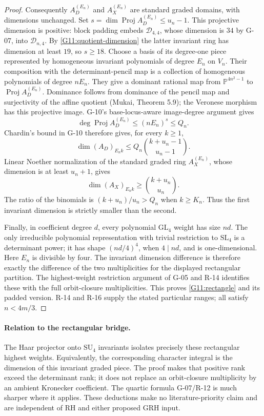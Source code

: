 \documentclass[11pt,a4paper]{article}
\theoremstyle{definition}\newtheorem{definition}{Definition}
\begin{document}
\begin{proof}
Consequently $A_D^{(E_n)}$ and $A_X^{(E_n)}$ are standard
graded domains, with dimensions unchanged. Set
$s=\dim\operatorname{Proj}A_D^{(E_n)}\leq u_n-1$.
This projective dimension is positive: block padding embeds
$\mathcal D_{4,4}$, whose dimension is $34$ by G-07,
into $\mathcal D_{n,4}$. By \eqref{G11:quotient-dimension}
the latter invariant ring has dimension at least $19$,
so $s\geq18$.
Choose a basis of its degree-one piece represented by
homogeneous invariant polynomials of degree $E_n$ on $V_n$.
Their composition with the determinant-pencil map is a
collection of homogeneous polynomials of degree $nE_n$.
They give a dominant rational map from
$\mathbb P^{4n^2-1}$ to $\operatorname{Proj}A_D^{(E_n)}$.
Dominance follows from dominance of the pencil map and
surjectivity of the affine quotient (Mukai, Theorem 5.9);
the Veronese morphism has this projective image. G-10's
base-locus-aware image-degree argument gives
\[
 \deg\operatorname{Proj}A_D^{(E_n)}
 \leq(nE_n)^s\leq Q_n.
\]
Chardin's bound in G-10 therefore gives, for every $k\geq1$,
\[
 \dim(A_D)_{E_nk}
 \leq Q_n\binom{k+u_n-1}{u_n-1}.
\]
Linear Noether normalization of the standard graded ring
$A_X^{(E_n)}$, whose dimension is at least $u_n+1$, gives
\[
 \dim(A_X)_{E_nk}\geq\binom{k+u_n}{u_n}.
\]
The ratio of the binomials is $(k+u_n)/u_n>Q_n$ when
$k\geq K_n$. Thus the first invariant dimension is strictly
smaller than the second.

Finally, in coefficient degree $d$, every polynomial
$\mathrm{GL}_4$ weight has size $nd$. The only irreducible
polynomial representation with trivial restriction to
$\mathrm{SL}_4$ is a determinant power; it has shape
$(nd/4)^4$, when $4\mid nd$, and is one-dimensional.
Here $E_n$ is divisible by four. The invariant dimension
difference is therefore exactly the difference of the two
multiplicities for the displayed rectangular partition.
The highest-weight restriction argument of G-05 and R-14
identifies these with the full orbit-closure multiplicities.
This proves \eqref{G11:rectangle} and its padded version.
R-14 and R-16 supply the stated particular ranges; all
satisfy $n<4m/3$.
\end{proof}
\paragraph{Relation to the rectangular bridge.}
The Haar projector onto $\mathrm{SU}_4$ invariants isolates
precisely these rectangular highest weights. Equivalently,
the corresponding character integral is the dimension of
this invariant graded piece. The proof makes that positive
rank exceed the determinant rank; it does not replace an
orbit-closure multiplicity by an ambient Kronecker
coefficient. The quartic formula G-07/R-12 is much sharper
where it applies. These deductions make no literature-priority
claim and are independent of RH and either proposed GRH input.
\end{document}
